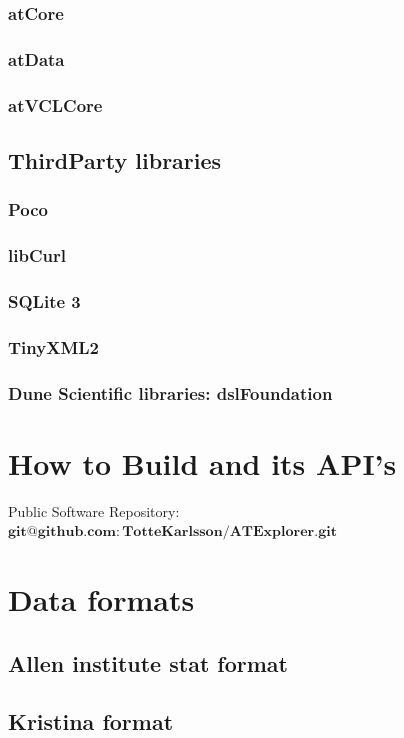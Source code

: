 \documentclass[11pt,fleqn]{book} %
\begin{document}
\begin{appendices}
\subsection{atCore}
\subsection{atData}
\subsection{atVCLCore}

\section{ThirdParty libraries}
\subsection{Poco}
\subsection{libCurl}
\subsection{SQLite 3}
\subsection{TinyXML2}
\subsection{Dune Scientific libraries: dslFoundation}


\chapter{How to Build \ate  and its API's}

Public Software Repository: $\mathbf{git@github.com:TotteKarlsson/ATExplorer.git}$

\chapter{Data formats}
\section{Allen institute stat format}

\section {Kristina format}



\end{appendices}
\end{document}
